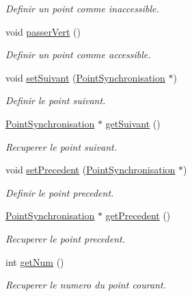 \begin{DoxyCompactItemize}
\begin{DoxyCompactList}\small\item\em Definir un point comme inaccessible. \item\end{DoxyCompactList}\item 
\hypertarget{classPointSynchronisation_a2044b3c16c50491cababb1ff16f03252}{
void \hyperlink{classPointSynchronisation_a2044b3c16c50491cababb1ff16f03252}{passerVert} ()}
\label{classPointSynchronisation_a2044b3c16c50491cababb1ff16f03252}

\begin{DoxyCompactList}\small\item\em Definir un point comme accessible. \item\end{DoxyCompactList}\item 
void \hyperlink{classPointSynchronisation_a8f677010a6ec932eba3b15a586c575ad}{setSuivant} (\hyperlink{classPointSynchronisation}{PointSynchronisation} $\ast$)
\begin{DoxyCompactList}\small\item\em Definir le point suivant. \item\end{DoxyCompactList}\item 
\hyperlink{classPointSynchronisation}{PointSynchronisation} $\ast$ \hyperlink{classPointSynchronisation_a0e5b8f12043e94e9bf5b4a1d798830ff}{getSuivant} ()
\begin{DoxyCompactList}\small\item\em Recuperer le point suivant. \item\end{DoxyCompactList}\item 
void \hyperlink{classPointSynchronisation_a91a058d0174071f36d6132b3afcafdc3}{setPrecedent} (\hyperlink{classPointSynchronisation}{PointSynchronisation} $\ast$)
\begin{DoxyCompactList}\small\item\em Definir le point precedent. \item\end{DoxyCompactList}\item 
\hyperlink{classPointSynchronisation}{PointSynchronisation} $\ast$ \hyperlink{classPointSynchronisation_a7929df6ad2b116b1831c18561000f1bd}{getPrecedent} ()
\begin{DoxyCompactList}\small\item\em Recuperer le point precedent. \item\end{DoxyCompactList}\item 
int \hyperlink{classPointSynchronisation_a46838a33d790814c14cf284f48beac7c}{getNum} ()
\begin{DoxyCompactList}\small\item\em Recuperer le numero du point courant. \item\end{DoxyCompactList}\end{DoxyCompactItemize}
